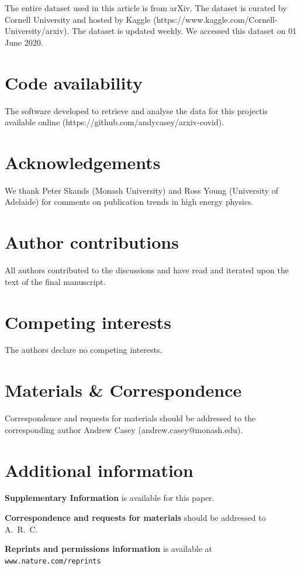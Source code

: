 \documentclass[a4paper,12pt]{article}
\newcommand{\arxiv}{arXiv}
\begin{document}
The entire dataset used in this article is from \arxiv. The dataset is curated by Cornell University and hosted by Kaggle (https://www.kaggle.com/Cornell-University/arxiv). The dataset is updated weekly. We accessed this dataset on 01 June 2020.



\section*{Code availability}
The software developed to retrieve and analyse the data for this projectis available online (https://github.com/andycasey/arxiv-covid).




\section*{Acknowledgements}
We thank Peter Skands (Monash University) 
	 and Ross Young (University of Adelaide) 
for comments on publication trends in high energy physics.

\section*{Author contributions}

All authors contributed to the discussions and have read and iterated upon the text of the final manuscript. 

\section*{Competing interests}
The authors declare no competing interests. 

\section*{Materials \& Correspondence}
Correspondence and requests for materials should be addressed to the corresponding author Andrew Casey (andrew.casey@monash.edu).

\section*{Additional information}

\textbf{Supplementary Information} is available for this paper.

\noindent\textbf{Correspondence and requests for materials} should be addressed to A.~R.~C.

\noindent\textbf{Reprints and permissions information} is available at {\tt\small www.nature.com/reprints}
\end{document}
